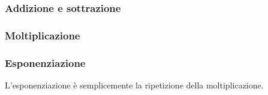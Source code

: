 
\textsf{\small }

\subsubsection{Addizione e sottrazione} %


\textsf{\small }

\subsubsection{Moltiplicazione}



\subsubsection{Esponenziazione} %

\textsf{\small L'esponenziazione è semplicemente la ripetizione della moltiplicazione.}



